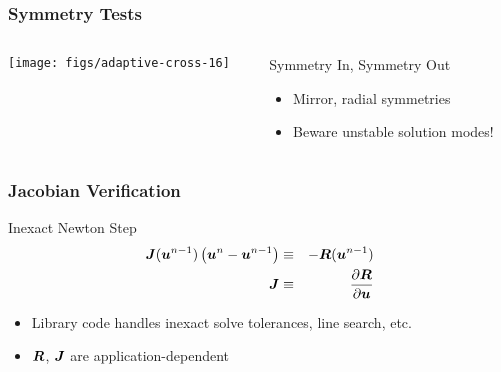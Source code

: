 \begin{frame}
\frametitle{Symmetry Tests}
\begin{columns}
\begin{column}{.4\textwidth}
\begin{center}
\texttt{[image: figs/adaptive-cross-16]}
\end{center}
\end{column}
\begin{column}{.6\textwidth}
\begin{block}{Symmetry In, Symmetry Out}
\begin{itemize}
\item Mirror, radial symmetries
\item Beware unstable solution modes!
\end{itemize}
\end{block}
\end{column}
\end{columns}

\end{frame}

\begin{frame}
\frametitle{Jacobian Verification}
\begin{block}{Inexact Newton Step}
\begin{eqnarray*}
{\boldsymbol{J}}({\boldsymbol{u}}^{n-1}) \left({\boldsymbol{u}}^n - {\boldsymbol{u}}^{n-1}\right) & \equiv &
-{\boldsymbol{R}}({\boldsymbol{u}}^{n-1}) \\
{\boldsymbol{J}} & \equiv & \frac{\partial {\boldsymbol{R}}}{\partial {\boldsymbol{u}}}
\end{eqnarray*}

\begin{itemize}
\item Library code handles inexact solve tolerances, line search,
etc.
\item ${\boldsymbol{R}}$, ${\boldsymbol{J}}$ are application-dependent
\end{itemize}
\end{block}
\end{frame}


